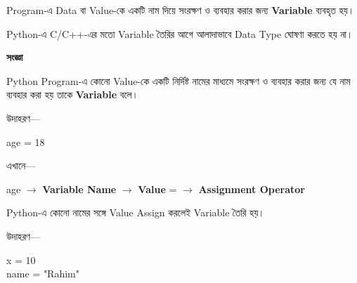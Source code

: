 
Program-এ Data বা Value-কে একটি নাম দিয়ে সংরক্ষণ ও ব্যবহার
করার জন্য \textbf{Variable} ব্যবহৃত হয়।

Python-এ C/C++-এর মতো Variable তৈরির আগে আলাদাভাবে
Data Type ঘোষণা করতে হয় না।



\begin{definitionbox}

\textbf{\color{darkTeal}সংজ্ঞা}

Python Program-এ কোনো Value-কে একটি নির্দিষ্ট নামের মাধ্যমে
সংরক্ষণ ও ব্যবহার করার জন্য যে নাম ব্যবহার করা হয় তাকে
\textbf{Variable} বলে।

\end{definitionbox}

উদাহরণ—

\begin{codebox}

\begin{english}
\ttfamily
age = 18
\end{english}

\end{codebox}

এখানে—

\begin{center}

\textenglish{\ttfamily age}
\(\longrightarrow\)
\textbf{Variable Name}
\qquad
\textenglish{}
\(\longrightarrow\)
\textbf{Value}
\qquad
\textenglish{\ttfamily =}
\(\longrightarrow\)
\textbf{Assignment Operator}

\end{center}



Python-এ কোনো নামের সঙ্গে Value Assign করলেই Variable তৈরি হয়।

উদাহরণ—

\begin{codebox}

\begin{english}
\ttfamily
x = 10\\
name = "Rahim"
\end{english}

\end{codebox}

